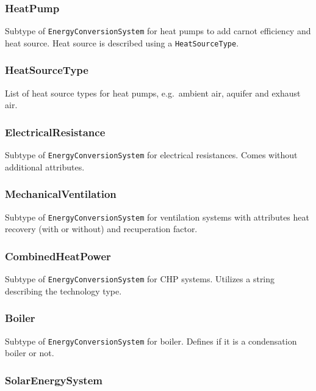 \documentclass[a4paper,12pt]{article}
\begin{document}
\subsubsection{HeatPump}\label{heatpump}

Subtype of \texttt{EnergyConversionSystem} for heat pumps to add carnot
efficiency and heat source. Heat source is described using a
\texttt{HeatSourceType}.

\subsubsection{HeatSourceType}\label{heatsourcetype}

List of heat source types for heat pumps, e.g.~ambient air, aquifer and
exhaust air.

\subsubsection{ElectricalResistance}\label{electricalresistance}

Subtype of \texttt{EnergyConversionSystem} for electrical resistances.
Comes without additional attributes.

\subsubsection{MechanicalVentilation}\label{mechanicalventilation}

Subtype of \texttt{EnergyConversionSystem} for ventilation systems with
attributes heat recovery (with or without) and recuperation factor.

\subsubsection{CombinedHeatPower}\label{combinedheatpower}

Subtype of \texttt{EnergyConversionSystem} for CHP systems. Utilizes a
string describing the technology type.

\subsubsection{Boiler}\label{boiler}

Subtype of \texttt{EnergyConversionSystem} for boiler. Defines if it is
a condensation boiler or not.

\subsubsection{SolarEnergySystem}\label{solarenergysystem}
\end{document}
